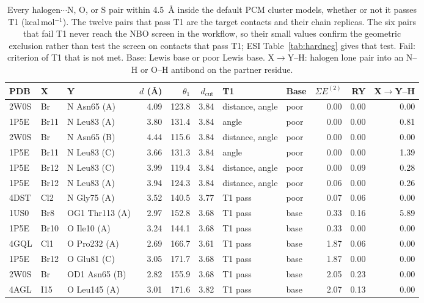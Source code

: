 \begin{table}[!htbp]\centering\scriptsize\setlength{\tabcolsep}{3pt}
\caption{Every halogen$\cdots$N, O, or S pair within 4.5~\AA{} inside the default PCM cluster models, whether or not it passes T1 (kcal\,mol$^{-1}$). The twelve pairs that pass T1 are the target contacts and their chain replicas. The six pairs that fail T1 never reach the NBO screen in the workflow, so their small values confirm the geometric exclusion rather than test the screen on contacts that pass T1; ESI Table~\ref{tab:hardneg} gives that test. Fail: criterion of T1 that is not met. Base: Lewis base or poor Lewis base. X$\to$Y--H: halogen lone pair into an N--H or O--H antibond on the partner residue.}\label{tab:pairs}
\begin{tabular}{lllrrrllrrr}\toprule PDB & X & Y & $d$ (\AA) & $\theta_1$ & $d_\mathrm{cut}$ & T1 & Base & $\Sigma E^{(2)}$ & RY & X$\to$Y--H\\\midrule
2W0S & Br & N Asn65 (A) & 4.09 & 123.8 & 3.84 & distance, angle & poor & 0.00 & 0.00 & 0.00\\
1P5E & Br11 & N Leu83 (A) & 3.80 & 131.4 & 3.84 & angle & poor & 0.00 & 0.00 & 0.81\\
2W0S & Br & N Asn65 (B) & 4.44 & 115.6 & 3.84 & distance, angle & poor & 0.00 & 0.00 & 0.00\\
1P5E & Br11 & N Leu83 (C) & 3.66 & 131.3 & 3.84 & angle & poor & 0.00 & 0.00 & 1.39\\
1P5E & Br12 & N Leu83 (C) & 3.99 & 119.4 & 3.84 & distance, angle & poor & 0.00 & 0.09 & 0.28\\
1P5E & Br12 & N Leu83 (A) & 3.94 & 124.3 & 3.84 & distance, angle & poor & 0.06 & 0.00 & 0.26\\
4DST & Cl2 & N Gly75 (A) & 3.52 & 140.5 & 3.77 & T1 pass & poor & 0.07 & 0.06 & 0.00\\
1US0 & Br8 & OG1 Thr113 (A) & 2.97 & 152.8 & 3.68 & T1 pass & base & 0.33 & 0.16 & 5.89\\
1P5E & Br10 & O Ile10 (A) & 3.24 & 144.1 & 3.68 & T1 pass & base & 0.33 & 0.00 & 0.00\\
4GQL & Cl1 & O Pro232 (A) & 2.69 & 166.7 & 3.61 & T1 pass & base & 1.87 & 0.06 & 0.00\\
1P5E & Br12 & O Glu81 (C) & 3.05 & 171.7 & 3.68 & T1 pass & base & 1.87 & 0.00 & 0.00\\
2W0S & Br & OD1 Asn65 (B) & 2.82 & 155.9 & 3.68 & T1 pass & base & 2.05 & 0.23 & 0.00\\
4AGL & I15 & O Leu145 (A) & 3.01 & 171.6 & 3.82 & T1 pass & base & 2.07 & 0.13 & 0.00\\

\end{tabular}
\end{table}

